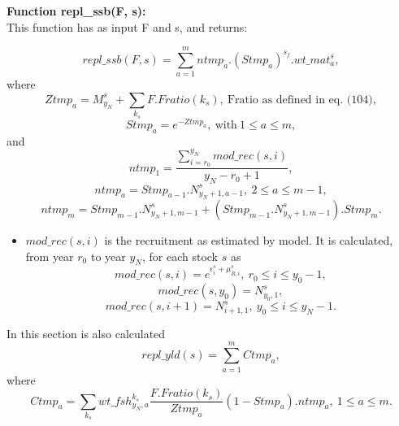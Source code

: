 \documentclass{article}
\begin{document}
\textbf{Function repl\_ssb(F, s):}\\
This function has as input F and s, and returns:

\begin{equation}
    repl\_ssb(F,s)=\sum_{a=1}^m ntmp_a. (Stmp_a)^{s_f}.wt\_mat^s_a,
\end{equation}
where
\begin{equation}
    Ztmp_a=M^s_{y_N}+\sum_{k_s}F.Fratio(k_s), \ \text{Fratio as defined in eq. (104)},
\end{equation}
\begin{equation}
    Stmp_a=e^{-Ztmp_a}, \ \text{with} \ 1\leq a \leq m,
\end{equation}
and
\begin{equation}
    ntmp_1 = \dfrac{\displaystyle\sum_{i=r_0}^{y_N} {mod\_rec}(s,i)}{{y_N}-r_0+1},
\end{equation}
\begin{equation}
    ntmp_a=Stmp_{a-1}.N^s_{y_N+1,{a-1}}, \ 2\leq a\leq m-1,
\end{equation}
\begin{equation}
    ntmp_{m}=Stmp_{m-1}.N^s_{y_N+1,m-1}+(Stmp_{m-1}.N^s_{y_N+1,m-1}).Stmp_{m}.
\end{equation}
\begin{itemize}
    \item  $mod\_rec(s,i)$ is the recruitment as estimated by model. It is calculated, from year $r_0$ to year $y_N$, for each stock $s$ as
     \begin{equation}
        mod\_rec(s,i)=e^{\epsilon^s_i+\mu^s_{R,i}}, \ r_0\leq i \leq y_0-1,
    \end{equation}
    \begin{equation}
        mod\_rec(s,y_0)=N^s_{y_0,1},
    \end{equation}
    \begin{equation}
        mod\_rec(s,i+1)=N^s_{i+1,1}, \ y_0\leq i \leq y_N-1.
    \end{equation}
   
\end{itemize}
In this section is also calculated
\begin{equation}
    repl\_yld(s)=\sum_{a=1}^m Ctmp_a,
\end{equation}
where
\begin{equation}
    Ctmp_a=\sum_{k_s} wt\_fsh^{k_s}_{y_N,a}\dfrac{F.Fratio(k_s)}{Ztmp_a}(1-Stmp_a).ntmp_a, \ 1\leq a \leq m.
\end{equation}
\end{document}
